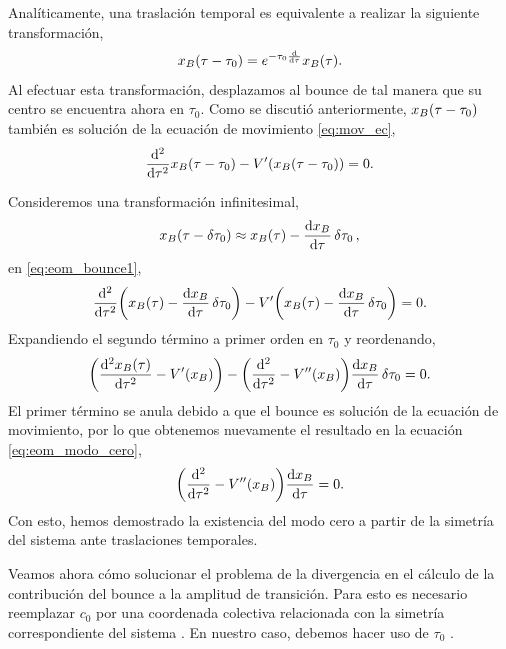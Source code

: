Analíticamente, una traslación temporal es equivalente a realizar la siguiente transformación,
\begin{equation}
x_B \qty(\tau - \tau_0) = e^{-\tau_0 \dv{\tau}} x_B \qty(\tau).
\end{equation}
Al efectuar esta transformación, desplazamos al bounce de tal manera que su centro se encuentra ahora en $\tau_0$.
Como se discutió anteriormente, $x_B \qty(\tau - \tau_0)$ también es solución de la ecuación de movimiento \eqref{eq:mov_ec},
\begin{equation} \label{eq:eom_bounce1}
\dv[2]{\tau}x_B \qty(\tau - \tau_0) - V'(x_B \qty(\tau - \tau_0)) = 0. 
\end{equation}

Consideremos una transformación infinitesimal,
\begin{equation} \label{eq:bounce_inf}
x_B \qty(\tau - \var{\tau_0}) \approx x_B \qty(\tau) -  \dv{x_B }{\tau}\var{\tau_0},
\end{equation}
en \eqref{eq:eom_bounce1},
\begin{equation}
\dv[2]{\tau} \qty(x_B \qty(\tau) -  \dv{x_B}{\tau}\var{\tau_0}) - V'\qty(x_B \qty(\tau) - \dv{x_B}{\tau}\var{\tau_0}) = 0.
\end{equation}
Expandiendo el segundo término a primer orden en $\tau_0$ y reordenando,
\begin{equation}
\qty(\dv[2]{x_B \qty(\tau)}{\tau} - V'\qty(x_B)) -  \qty(\dv[2]{\tau} - V''\qty(x_B))\dv{x_B}{\tau}\var{\tau_0} = 0.
\end{equation}
El primer término se anula debido a que el bounce es solución de la ecuación de movimiento, por lo que obtenemos nuevamente el resultado en la ecuación \eqref{eq:eom_modo_cero}, 
\begin{equation}
\qty(\dv[2]{\tau} - V''\qty(x_B))\dv{x_B}{\tau} = 0.
\end{equation}
Con esto, hemos demostrado la existencia del modo cero a partir de la simetría del sistema ante traslaciones temporales. 

Veamos ahora cómo solucionar el problema de la divergencia en el cálculo de la contribución del bounce a la amplitud de transición. 
Para esto es necesario reemplazar $c_0$
por una coordenada colectiva relacionada con la simetría correspondiente del sistema . En nuestro caso, debemos hacer uso de $\tau_0$  %
\cite{weinberg2012classical, paranjape2017theory}. 

